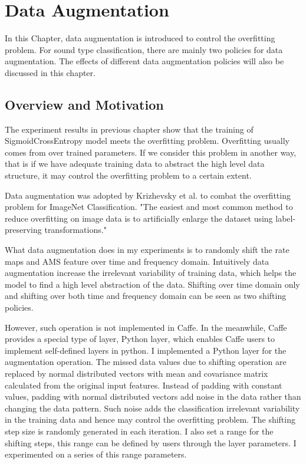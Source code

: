 \chapter{Data Augmentation}
\label{chap:dataAug}
In this Chapter, data augmentation is introduced to control the overfitting problem. For sound type classification, there are mainly two policies for data augmentation. The effects of different data augmentation policies will also be discussed in this chapter.
\section{Overview and Motivation}
The experiment results in previous chapter show that the training of SigmoidCrossEntropy model meets the overfitting problem. Overfitting usually comes from over trained parameters. If we consider this problem in another way, that is if we have adequate training data to abstract the high level data structure, it may control the overfitting problem to a certain extent. 

Data augmentation was adopted by Krizhevsky et al. to combat the overfitting problem for ImageNet Classification.\cite{krizhevsky2012imagenet} "The easiest and most common method to reduce overfitting on image data is to artificially enlarge the dataset using label-preserving transformations."

What data augmentation does in my experiments is to randomly shift the rate maps and AMS feature over time and frequency domain. Intuitively data augmentation increase the irrelevant variability of training data, which helps the model to find a high level abstraction of the data.  Shifting over time domain only and shifting over both time and frequency domain can be seen as two shifting policies. 

However, such operation is not implemented in Caffe. In the meanwhile, Caffe provides a special type of layer, Python layer, which enables Caffe users to implement self-defined layers in python. I implemented a Python layer for the augmentation operation. The missed data values due to shifting operation are replaced by normal distributed vectors with mean and covariance matrix calculated from the original input features. Instead of padding with constant values, padding with normal distributed vectors add noise in the data rather than changing the data pattern. Such noise adds the classification irrelevant variability in the training data and hence may control the overfitting problem. The shifting step size is randomly generated in each iteration. I also set a range for the shifting steps, this range can be defined by users through the layer parameters. I experimented on a series of this range parameters. 


